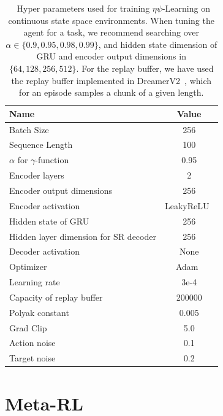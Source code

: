 \documentclass{article}
\theoremstyle{plain}
\theoremstyle{definition}
\theoremstyle{remark}
\newcommand{\alg}{$\eta$$\psi$-Learning}
\begin{document}
\begin{table}[hbt!]
	\centering
		\begin{tabular}{l|c}
			\toprule
			\textbf{Name} & \textbf{Value}\\
			\midrule
             Batch Size & 256 \\
             Sequence Length & 100 \\
             $\alpha$ for $\gamma$-function & 0.95 \\
             Encoder layers & 2\\
             Encoder output dimensions & 256\\ 
             Encoder activation & LeakyReLU~\cite{yu2017unsupervised} \\
             Hidden state of GRU & 256\\
             Hidden layer dimension for SR decoder & 256\\
             Decoder activation & None\\
             Optimizer & Adam~\cite{kingma2014adam} \\
             Learning rate & 3e-4\\
             Capacity of replay buffer & 200000 \\
             Polyak constant & 0.005 \\
             Grad Clip & 5.0 \\
             Action noise & 0.1 \\
             Target noise & 0.2 \\
            \bottomrule
    	\end{tabular}
	\caption{\ Hyper parameters used for training \alg{} on continuous state space environments. When tuning the agent for a task, we recommend searching over $\alpha \in \{0.9, 0.95, 0.98, 0.99\}$, and hidden state dimension of GRU and encoder output dimensions in $\{64, 128, 256, 512\}$. For the replay buffer, we have used the replay buffer implemented in DreamerV2~\cite{hafner2020dreamerv2}, which for an episode samples a chunk of a given length.}
	\label{tab:appendix_hyperparameter_control}
\end{table}


\section{Meta-RL}
\label{app:metarl}
\end{document}
